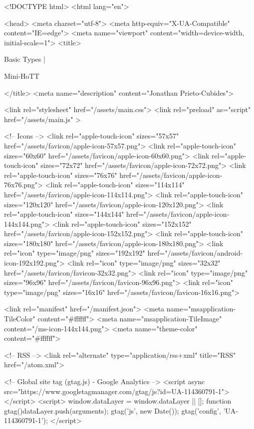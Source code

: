 <!DOCTYPE html>
<html lang="en">

<head>
  <meta charset="utf-8">
  <meta http-equiv="X-UA-Compatible" content="IE=edge">
  <meta name="viewport" content="width=device-width, initial-scale=1">
  <title>
    
      
        Basic Types |
      
        Mini-HoTT
    
  </title>
  <meta name="description" content="Jonathan Prieto-Cubides">

  <link rel="stylesheet" href="/assets/main.css">
  <link rel="preload" as="script" href="/assets/main.js" >

  <!-- Icons -->
  <link rel="apple-touch-icon" sizes="57x57" href="/assets/favicon/apple-icon-57x57.png">
  <link rel="apple-touch-icon" sizes="60x60" href="/assets/favicon/apple-icon-60x60.png">
  <link rel="apple-touch-icon" sizes="72x72" href="/assets/favicon/apple-icon-72x72.png">
  <link rel="apple-touch-icon" sizes="76x76" href="/assets/favicon/apple-icon-76x76.png">
  <link rel="apple-touch-icon" sizes="114x114" href="/assets/favicon/apple-icon-114x114.png">
  <link rel="apple-touch-icon" sizes="120x120" href="/assets/favicon/apple-icon-120x120.png">
  <link rel="apple-touch-icon" sizes="144x144" href="/assets/favicon/apple-icon-144x144.png">
  <link rel="apple-touch-icon" sizes="152x152" href="/assets/favicon/apple-icon-152x152.png">
  <link rel="apple-touch-icon" sizes="180x180" href="/assets/favicon/apple-icon-180x180.png">
  <link rel="icon" type="image/png" sizes="192x192"  href="/assets/favicon/android-icon-192x192.png">
  <link rel="icon" type="image/png" sizes="32x32" href="/assets/favicon/favicon-32x32.png">
  <link rel="icon" type="image/png" sizes="96x96" href="/assets/favicon/favicon-96x96.png">
  <link rel="icon" type="image/png" sizes="16x16" href="/assets/favicon/favicon-16x16.png">

  <link rel="manifest" href="/manifest.json">
  <meta name="msapplication-TileColor" content="#ffffff">
  <meta name="msapplication-TileImage" content="/ms-icon-144x144.png">
  <meta name="theme-color" content="#ffffff">

  <!-- RSS -->
  <link rel="alternate" type="application/rss+xml" title="RSS" href="/atom.xml">

  <!-- Global site tag (gtag.js) - Google Analytics -->
  <script async src="https://www.googletagmanager.com/gtag/js?id=UA-114360791-1"></script>
  <script>
    window.dataLayer = window.dataLayer || [];
    function gtag(){dataLayer.push(arguments);}
    gtag('js', new Date());
    gtag('config', 'UA-114360791-1');
  </script>

